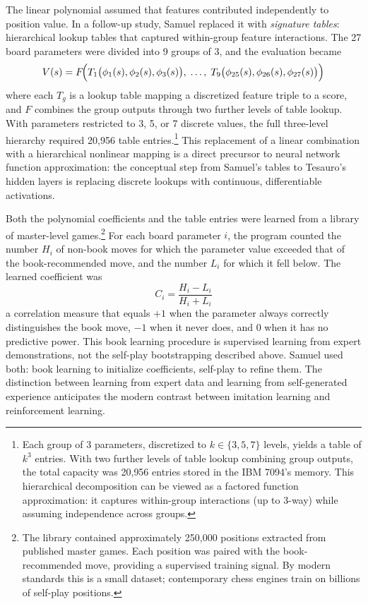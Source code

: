 The linear polynomial assumed that features contributed independently to position value. In a follow-up study, Samuel replaced it with \emph{signature tables}: hierarchical lookup tables that captured within-group feature interactions. The 27 board parameters were divided into 9 groups of 3, and the evaluation became
\begin{equation}
V(s) = F\!\Bigl(T_1\bigl(\phi_1(s), \phi_2(s), \phi_3(s)\bigr),\; \ldots,\; T_9\bigl(\phi_{25}(s), \phi_{26}(s), \phi_{27}(s)\bigr)\Bigr)
\end{equation}
where each $T_g$ is a lookup table mapping a discretized feature triple to a score, and $F$ combines the group outputs through two further levels of table lookup. With parameters restricted to 3, 5, or 7 discrete values, the full three-level hierarchy required 20{,}956 table entries.\footnote{Each group of 3 parameters, discretized to $k \in \{3, 5, 7\}$ levels, yields a table of $k^3$ entries. With two further levels of table lookup combining group outputs, the total capacity was 20{,}956 entries stored in the IBM 7094's memory. This hierarchical decomposition can be viewed as a factored function approximation: it captures within-group interactions (up to 3-way) while assuming independence across groups.} This replacement of a linear combination with a hierarchical nonlinear mapping is a direct precursor to neural network function approximation: the conceptual step from Samuel's tables to Tesauro's hidden layers is replacing discrete lookups with continuous, differentiable activations.

Both the polynomial coefficients and the table entries were learned from a library of master-level games.\footnote{The library contained approximately 250{,}000 positions extracted from published master games. Each position was paired with the book-recommended move, providing a supervised training signal. By modern standards this is a small dataset; contemporary chess engines train on billions of self-play positions.} For each board parameter $i$, the program counted the number $H_i$ of non-book moves for which the parameter value exceeded that of the book-recommended move, and the number $L_i$ for which it fell below. The learned coefficient was
\begin{equation}
C_i = \frac{H_i - L_i}{H_i + L_i}
\end{equation}
a correlation measure that equals $+1$ when the parameter always correctly distinguishes the book move, $-1$ when it never does, and $0$ when it has no predictive power. This book learning procedure is supervised learning from expert demonstrations, not the self-play bootstrapping described above. Samuel used both: book learning to initialize coefficients, self-play to refine them. The distinction between learning from expert data and learning from self-generated experience anticipates the modern contrast between imitation learning and reinforcement learning.

